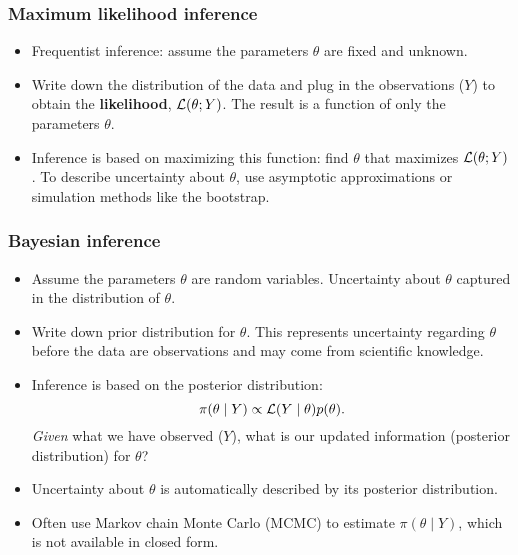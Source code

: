 \documentclass{beamer}
\begin{document}
\begin{frame}
  \frametitle{Maximum likelihood inference} %
  \begin{itemize}
  \item Frequentist inference: assume the parameters $\theta$ are fixed and unknown. 
  \item Write down the distribution of the data and plug in the observations ($Y$) to obtain the {\bf likelihood}, ${\cal L}(\theta; Y)$. The result is a function of only the parameters $\theta$.\\
\item Inference is based on maximizing this function: find $\theta$ that maximizes ${\cal L}(\theta; Y)$. To describe uncertainty about $\theta$, use asymptotic approximations or simulation methods like the bootstrap.
\end{itemize}
\end{frame}

\begin{frame}
  \frametitle{Bayesian inference} %
  \begin{itemize}
  \item Assume the parameters $\theta$ are random variables. Uncertainty about $\theta$ captured in the distribution of $\theta$.
  \item Write down prior distribution for $\theta$. This represents
    uncertainty regarding $\theta$ before the data are observations and may come from scientific knowledge.
  \item Inference is based on the posterior distribution:
    $$\pi(\theta\mid Y) \propto {\cal L}(Y\mid \theta) p(\theta).  $$
    {\it Given} what we have observed ($Y$), what is our updated
    information (posterior distribution) for $\theta$?
\item Uncertainty about $\theta$ is automatically described by its posterior distribution.
\item Often use Markov chain Monte Carlo (MCMC) to estimate
  $\pi(\theta\mid Y)$, which is not available in closed form.
\end{itemize}
\end{frame}
\end{document}
